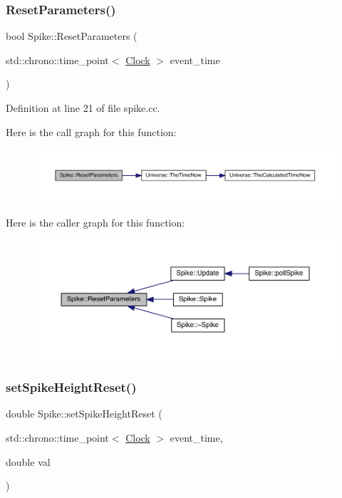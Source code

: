 \subsubsection{\texorpdfstring{Reset\+Parameters()}{ResetParameters()}}
{\footnotesize\ttfamily bool Spike\+::\+Reset\+Parameters (\begin{DoxyParamCaption}\item[{std\+::chrono\+::time\+\_\+point$<$ \hyperlink{universe_8h_a0ef8d951d1ca5ab3cfaf7ab4c7a6fd80}{Clock} $>$}]{event\+\_\+time }\end{DoxyParamCaption})}



Definition at line 21 of file spike.\+cc.

Here is the call graph for this function\+:
\nopagebreak
\begin{figure}[H]
\begin{center}
\leavevmode
\includegraphics[width=350pt]{class_spike_af4475560da7a33e70a0f2036197f000f_cgraph}
\end{center}
\end{figure}
Here is the caller graph for this function\+:
\nopagebreak
\begin{figure}[H]
\begin{center}
\leavevmode
\includegraphics[width=350pt]{class_spike_af4475560da7a33e70a0f2036197f000f_icgraph}
\end{center}
\end{figure}
\mbox{\label{class_spike_aed9745a5883c2f611def65b4e527287f}} 
\subsubsection{\texorpdfstring{set\+Spike\+Height\+Reset()}{setSpikeHeightReset()}}
{\footnotesize\ttfamily double Spike\+::set\+Spike\+Height\+Reset (\begin{DoxyParamCaption}\item[{std\+::chrono\+::time\+\_\+point$<$ \hyperlink{universe_8h_a0ef8d951d1ca5ab3cfaf7ab4c7a6fd80}{Clock} $>$}]{event\+\_\+time,  }\item[{double}]{val }\end{DoxyParamCaption})\hspace{0.3cm}{\ttfamily [inline]}}



